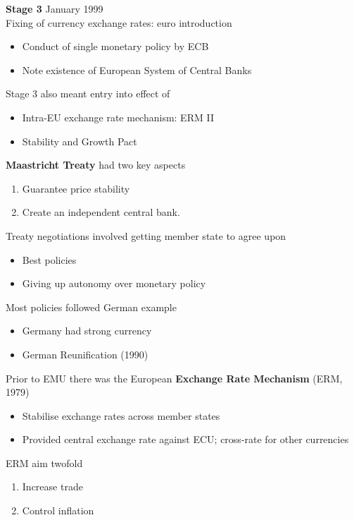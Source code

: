 \documentclass{beamer}
\begin{document}
\begin{frame}
  \textbf{Stage 3} January 1999\\
  Fixing of currency exchange rates: euro introduction
  \begin{itemize}
    \item Conduct of single monetary policy by ECB
    \item Note existence of European System of Central Banks
  \end{itemize}
  \medskip
  Stage 3 also meant entry into effect of
  \begin{itemize}
    \item Intra-EU exchange rate mechanism: ERM II
    \item Stability and Growth Pact
  \end{itemize}
\end{frame}

\begin{frame}
    \textbf{Maastricht Treaty} had two key aspects
\begin{enumerate}
  \item Guarantee price stability 
  \item Create an independent central bank. 
\end{enumerate}
\medskip
Treaty negotiations involved getting member state to agree upon
\begin{itemize}
  \item Best policies
  \item Giving up autonomy over monetary policy
\end{itemize}
\medskip
Most policies followed German example
\begin{itemize}
  \item Germany had strong currency
  \item German Reunification (1990)
\end{itemize}
\end{frame}

\begin{frame}
  Prior to EMU there was the European \textbf{Exchange Rate Mechanism} (ERM, 1979)\\
  \begin{itemize}
    \item Stabilise exchange rates across member states
    \item Provided central exchange rate against ECU; cross-rate for other currencies
  \end{itemize}
  \medskip
  ERM aim twofold
  \begin{enumerate}
    \item Increase trade
    \item Control inflation
  \end{enumerate}
\end{frame}
\end{document}
